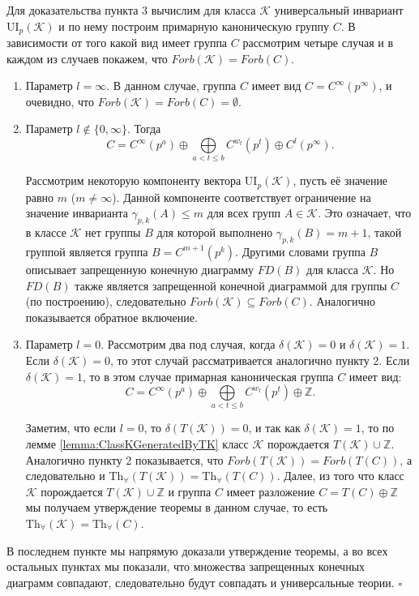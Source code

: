 \documentclass[a4paper,11pt,twoside]{article}
\def\K{{\mathcal{K}}}
\def\Z{{\mathbb{Z}}}
\def\Tha{{\mathrm{Th}_\forall}}
\def\ui{{\mathrm{UI}}}
\begin{document}
Для доказательства пункта 3 вычислим для класса $\K$ универсальный инвариант $\ui_p(\K)$ и по нему построим примарную каноническую группу $C$. В зависимости от того какой вид имеет группа $C$ рассмотрим четыре случая и в каждом из случаев покажем, что $Forb(\K) = Forb(C)$.
\begin{enumerate}
\item Параметр $l = \infty$. В данном случае, группа $C$ имеет вид $C = C^\infty (p^\infty)$, и очевидно, что $Forb(\K) = Forb(C) = \emptyset$.
\item Параметр $l \notin \{0, \infty\}$. Тогда 
$$ C = C^\infty(p^a) \oplus \bigoplus\limits_{ a < t \leq b} C^{w_t}(p^t) \oplus C^l(p^\infty).$$

Рассмотрим некоторую компоненту вектора $\ui_p(\K)$, пусть её значение равно $m$ ($m \neq \infty$). Данной компоненте соответствует ограничение на значение инварианта $\gamma_{p,k}(A) \leq m$ для всех групп $A \in \K$. Это означает, что в классе $\K$ нет группы $B$ для которой выполнено $\gamma_{p,k}(B) = m+1$, такой группой является группа $B = C^{m+1}(p^k)$. Другими словами группа $B$ описывает запрещенную конечную диаграмму $FD(B)$ для класса $\K$. Но $FD(B)$ также является запрещенной конечной диаграммой для группы $C$ (по построению), следовательно $Forb(\K) \subseteq Forb(C).$ Аналогично показывается обратное включение.

\item Параметр $l = 0$. Рассмотрим два под случая, когда $\delta(\K) = 0$ и $\delta(\K) = 1$. Если $\delta(\K) = 0$, то этот случай рассматривается аналогично пункту 2. Если $\delta(\K) = 1$, то в этом случае примарная каноническая группа $C$ имеет вид:
$$ C = C^\infty(p^a) \oplus \bigoplus\limits_{ a < t \leq b} C^{w_t}(p^t) \oplus \Z.$$

Заметим, что если $l = 0$, то $\delta(T(\K)) = 0$, и так как $\delta(\K) = 1$, то по лемме \ref{lemma:ClassKGeneratedByTK} класс $\K$ порождается $T(\K) \cup \Z$. Аналогично пункту 2 показывается, что $Forb(T(\K)) = Forb(T(C))$, а следовательно и $\Tha(T(\K)) = \Tha(T(C))$. Далее, из того что класс $\K$ порождается $T(\K) \cup \Z$ и группа $C$ имеет разложение $C = T(C) \oplus \Z$ мы получаем утверждение теоремы в данном случае, то есть $\Tha(\K) = \Tha(C)$.
\end{enumerate}

В последнем пункте мы напрямую доказали утверждение теоремы, а во всех остальных пунктах мы показали, что множества запрещенных конечных диаграмм совпадают, следовательно будут совпадать и универсальные теории. $\square$
\end{document}
